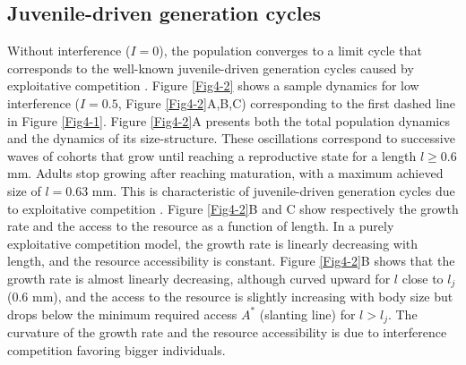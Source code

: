 \subsection{Juvenile-driven generation cycles}

Without interference ($I=0$), the population converges to a limit cycle that
corresponds to the well-known juvenile-driven generation cycles caused by
exploitative competition \autocite{de-roos1992a,de-roos1997a}. Figure
\ref{Fig4-2} shows a sample dynamics for low interference ($I=0.5$, Figure
\ref{Fig4-2}A,B,C) corresponding to the first dashed line in Figure
\ref{Fig4-1}. Figure \ref{Fig4-2}A presents both the total population dynamics
and the dynamics of its size-structure. These oscillations correspond to
successive waves of cohorts that grow until reaching a reproductive state for a
length $l\geq0.6$ mm. Adults stop growing after reaching maturation, with a
maximum achieved size of $l=0.63$ mm. This is characteristic of juvenile-driven
generation cycles due to exploitative competition
\autocite{de-roos1992a,de-roos2003b}. Figure \ref{Fig4-2}B and C show
respectively the growth rate and the access to the resource as a function of
length. In a purely exploitative competition model, the growth rate is linearly
decreasing with length, and the resource accessibility is constant.
Figure \ref{Fig4-2}B shows that the growth rate is almost linearly decreasing,
although curved upward for $l$ close to $l_j$ ($0.6$ mm), and the access to the
resource is slightly increasing with body size but drops below the minimum
required access $A^*$ (slanting line) for $l > l_j$. The curvature of the growth
rate and the resource accessibility is due to interference competition favoring
bigger individuals.

